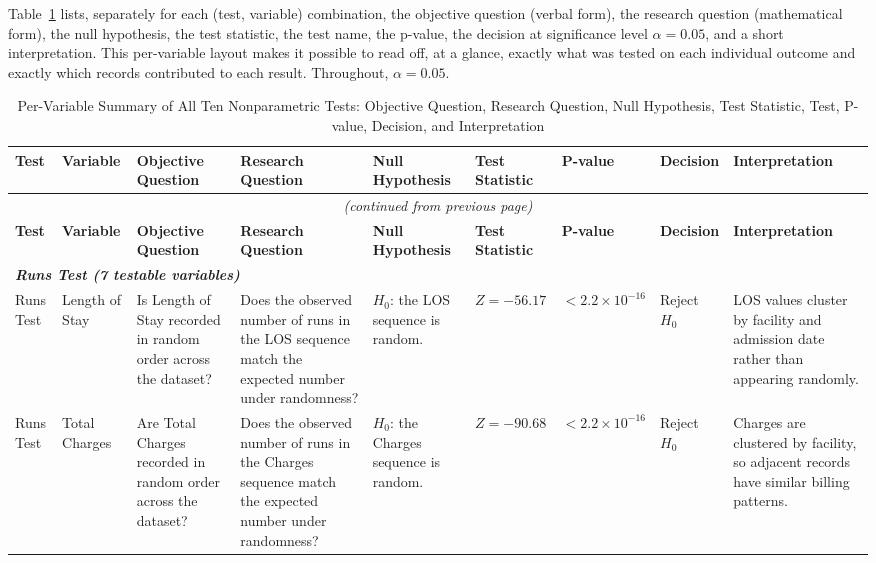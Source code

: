 \documentclass[12pt]{article}
\begin{document}
Table~\ref{tab:objectives} lists, separately for each (test, variable)
combination, the objective question (verbal form), the research
question (mathematical form), the null hypothesis, the test statistic,
the test name, the p-value, the decision at significance level
$\alpha=0.05$, and a short interpretation. This per-variable layout
makes it possible to read off, at a glance, exactly what was tested
on each individual outcome and exactly which records contributed to
each result. Throughout, $\alpha = 0.05$.

\begin{landscape}
\begin{scriptsize}
\renewcommand{\arraystretch}{1.15}
\begin{longtable}{p{2.0cm} p{2.4cm} p{3.0cm} p{2.7cm} p{2.5cm} p{1.7cm} p{1.3cm} p{1.3cm} p{3.0cm}}
\caption{Per-Variable Summary of All Ten Nonparametric Tests: Objective Question, Research Question, Null Hypothesis, Test Statistic, Test, P-value, Decision, and Interpretation}
\label{tab:objectives} \\
\toprule
\textbf{Test} & \textbf{Variable} & \textbf{Objective Question} & \textbf{Research Question} & \textbf{Null Hypothesis} & \textbf{Test Statistic} & \textbf{P-value} & \textbf{Decision} & \textbf{Interpretation} \\
\midrule
\endfirsthead
\multicolumn{9}{c}{\textit{(continued from previous page)}} \\
\toprule
\textbf{Test} & \textbf{Variable} & \textbf{Objective Question} & \textbf{Research Question} & \textbf{Null Hypothesis} & \textbf{Test Statistic} & \textbf{P-value} & \textbf{Decision} & \textbf{Interpretation} \\
\midrule
\endhead

\multicolumn{9}{l}{\textit{\textbf{Runs Test (7 testable variables)}}} \\

Runs Test & Length of Stay & Is Length of Stay recorded in random order across the dataset? & Does the observed number of runs in the LOS sequence match the expected number under randomness? & $H_0$: the LOS sequence is random. & $Z = -56.17$ & $< 2.2 \times 10^{-16}$ & Reject $H_0$ & LOS values cluster by facility and admission date rather than appearing randomly. \\

Runs Test & Total Charges & Are Total Charges recorded in random order across the dataset? & Does the observed number of runs in the Charges sequence match the expected number under randomness? & $H_0$: the Charges sequence is random. & $Z = -90.68$ & $< 2.2 \times 10^{-16}$ & Reject $H_0$ & Charges are clustered by facility, so adjacent records have similar billing patterns. \\


\end{longtable}
\end{scriptsize}
\end{landscape}
\end{document}
